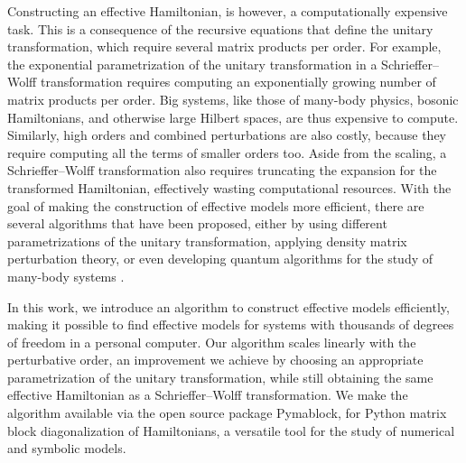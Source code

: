 Constructing an effective Hamiltonian, is however, a computationally expensive
task.
This is a consequence of the recursive equations that define the unitary
transformation, which require several matrix products per order.
For example, the exponential parametrization of the unitary
transformation in a Schrieffer--Wolff transformation requires computing
an exponentially growing number of matrix products per order.
Big systems, like those of many-body physics, bosonic Hamiltonians, and
otherwise large Hilbert spaces, are thus expensive to compute.
Similarly, high orders and combined perturbations are also costly, because they
require computing all the terms of smaller orders too.
Aside from the scaling, a Schrieffer--Wolff transformation also requires
truncating the expansion for the transformed Hamiltonian, effectively wasting
computational resources.
With the goal of making the construction of effective models more efficient,
there are several algorithms that have been proposed, either by using different
parametrizations of the unitary transformation, applying density matrix
perturbation theory, or even developing quantum algorithms for the study
of many-body systems \cite{Wurtz_2020, Zhang_2022}.

In this work, we introduce an algorithm to construct effective models
efficiently, making it possible to find effective models for systems with
thousands of degrees of freedom in a personal computer.
Our algorithm scales linearly with the perturbative order, an improvement
we achieve by choosing an appropriate parametrization of the unitary
transformation, while still obtaining the same effective Hamiltonian as
a Schrieffer--Wolff transformation.
We make the algorithm available via the open source package Pymablock, for
Python matrix block diagonalization of Hamiltonians, a versatile tool for
the study of numerical and symbolic models.
